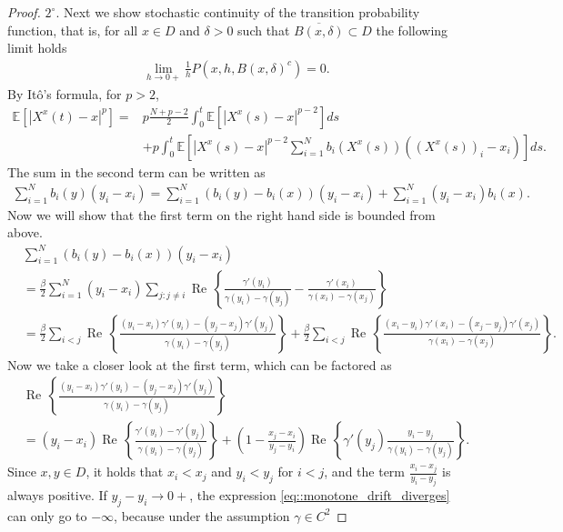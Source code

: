 \documentclass[11pt]{article}
\renewcommand{\Re}{\operatorname{Re}\,}
\numberwithin{equation}{section}
\theoremstyle{definition}
\begin{document}
\begin{proof}
$2^{\circ}.$ Next we show stochastic continuity of the transition probability function, that is, for all $x\in D$ and $\delta > 0$ such that $\overline{B(x,\delta)}\subset D$ the following limit holds
\begin{align*}
    \lim\limits_{h\to 0+}\frac{1}{h}P(x,h,B(x,\delta)^{c})=0.
\end{align*}
By Itô's formula, for $p>2$,
\begin{align*}
    \mathbb{E}\left[|X^{x}(t)-x|^{p}\right] 
    = &p\frac{N+p-2}{2}\int_{0}^{t}\mathbb{E}\left[|X^{x}(s)-x|^{p-2}\right]ds \\
    &+ p \int_{0}^{t}\mathbb{E}\left[|X^{x}(s)-x|^{p-2}\sum\limits_{i=1}^{N}b_{i}(X^{x}(s))((X^{x}(s))_{i}-x_{i})\right]ds.
\end{align*}
The sum in the second term can be written as
\begin{align*}
    \sum\limits_{i=1}^{N}b_{i}(y)(y_{i}-x_{i}) 
    = \sum\limits_{i=1}^{N}(b_{i}(y)-b_{i}(x))(y_{i}-x_{i})  +\sum\limits_{i=1}^{N} (y_{i}-x_{i})b_{i}(x). 
\end{align*}
Now we will show that the first term on the right hand side is bounded from above.
\begin{align*}
     &\sum\limits_{i=1}^{N}(b_{i}(y)-b_{i}(x))(y_{i}-x_{i}) \\
     &= \frac{\beta}{2}\sum\limits_{i=1}^{N}(y_{i}-x_{i})\sum\limits_{j:j\neq i}\Re\left\{\frac{\gamma'(y_{i})}{\gamma(y_{i})-\gamma(y_{j})}-\frac{\gamma'(x_{i})}{\gamma(x_{i})-\gamma(x_{j})} \right\}\\
     &= \frac{\beta}{2}\sum_{i < j}\Re\left\{\frac{(y_{i}-x_{i})\gamma'(y_{i})-(y_{j}-x_{j})\gamma'(y_{j})}{\gamma(y_{i})-\gamma(y_{j})}\right\}
    + \frac{\beta}{2} \sum_{i< j}\Re\left\{\frac{(x_{i}-y_{i})\gamma'(x_{i})-(x_{j}-y_{j})\gamma'(x_{j})}{\gamma(x_{i})-\gamma(x_{j})}\right\}.
\end{align*}
Now we take a closer look at the first term, which can be factored as
\begin{align}
    &\Re\left\{\frac{(y_{i}-x_{i})\gamma'(y_{i})-(y_{j}-x_{j})\gamma'(y_{j})}{\gamma(y_{i})-\gamma(y_{j})}\right\} \\
    &= (y_{i}-x_{i})\Re\left\{\frac{\gamma'(y_{i})-\gamma'(y_{j})}{\gamma(y_{i})-\gamma(y_{j})}\right\}
    + \left(1 - \frac{x_{j}-x_{i}}{y_{j}-y_{i}}\right)\Re\left\{\gamma'(y_{j})\frac{y_{i}-y_{j}}{\gamma(y_{i})-\gamma(y_{j})}\right\}.\label{eq::monotone_drift_diverges}
\end{align}
Since $x,y\in D$, it holds that $x_{i}<x_{j}$ and $y_{i}<y_{j}$ for $i<j$, and the term $\frac{x_{i}-x_{j}}{y_{i}-y_{j}}$ is always positive.  If $y_{j}-y_{i}\to0+$, the expression \eqref{eq::monotone_drift_diverges} can only go to $-\infty$, because under the assumption $\gamma\in C^2$

\end{proof}
\end{document}
